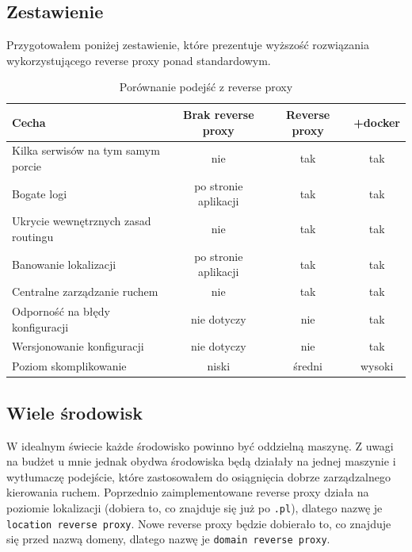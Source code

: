 \documentclass{article}
\begin{document}
\subsection{Zestawienie}

Przygotowałem poniżej zestawienie, które prezentuje wyższość rozwiązania wykorzystującego reverse proxy ponad standardowym.

\begin{table}[H]
\centering
\begin{tabular}{|l|c|c|c|}
\hline
\textbf{Cecha} & \textbf{Brak reverse proxy} & \textbf{Reverse proxy} & \textbf{+docker} \\ \hline
Kilka serwisów na tym samym porcie & \cellcolor{red!50}nie & \cellcolor{green!50}tak & \cellcolor{green!50}tak \\ \hline
Bogate logi  & \cellcolor{yellow!50}po stronie aplikacji & \cellcolor{green!50}tak & \cellcolor{green!50}tak \\ \hline
Ukrycie wewnętrznych zasad routingu & \cellcolor{red!50}nie & \cellcolor{green!50}tak & \cellcolor{green!50}tak \\ \hline
Banowanie lokalizacji & \cellcolor{yellow!50}po stronie aplikacji & \cellcolor{green!50}tak & \cellcolor{green!50}tak \\ \hline
Centralne zarządzanie ruchem & \cellcolor{red!50}nie & \cellcolor{green!50}tak & \cellcolor{green!50}tak \\ \hline
Odporność na błędy konfiguracji & \cellcolor{yellow!50}nie dotyczy & \cellcolor{red!50}nie & \cellcolor{green!50}tak \\ \hline
Wersjonowanie konfiguracji & \cellcolor{yellow!50}nie dotyczy & \cellcolor{red!50}nie & \cellcolor{green!50}tak \\ \hline
Poziom skomplikowanie & \cellcolor{green!50}niski & \cellcolor{yellow!50}średni & \cellcolor{red!50}wysoki \\ \hline
\end{tabular}
\caption{Porównanie podejść z reverse proxy}
\label{tab:porownanie-metod-wdrazania}
\end{table}

\subsection{Wiele środowisk}

W idealnym świecie każde środowisko powinno być oddzielną maszynę. Z uwagi na budżet u mnie jednak obydwa środowiska będą działały na jednej maszynie i wytłumaczę podejście, które zastosowałem do osiągnięcia dobrze zarządzalnego kierowania ruchem. Poprzednio zaimplementowane reverse proxy działa na poziomie lokalizacji (dobiera to, co znajduje się już po \lstinline|.pl|), dlatego nazwę je \lstinline|location reverse proxy|. Nowe reverse proxy będzie dobierało to, co znajduje się przed nazwą domeny, dlatego nazwę je \lstinline|domain reverse proxy|.
\end{document}
